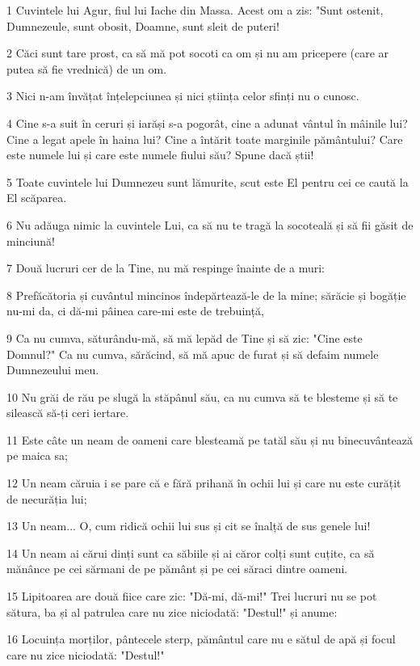 \par 1 Cuvintele lui Agur, fiul lui Iache din Massa. Acest om a zis: "Sunt ostenit, Dumnezeule, sunt obosit, Doamne, sunt sleit de puteri!
\par 2 Căci sunt tare prost, ca să mă pot socoti ca om și nu am pricepere (care ar putea să fie vrednică) de un om.
\par 3 Nici n-am învățat înțelepciunea și nici știința celor sfinți nu o cunosc.
\par 4 Cine s-a suit în ceruri și iarăși s-a pogorât, cine a adunat vântul în mâinile lui? Cine a legat apele în haina lui? Cine a întărit toate marginile pământului? Care este numele lui și care este numele fiului său? Spune dacă știi!
\par 5 Toate cuvintele lui Dumnezeu sunt lămurite, scut este El pentru cei ce caută la El scăparea.
\par 6 Nu adăuga nimic la cuvintele Lui, ca să nu te tragă la socoteală și să fii găsit de minciună!
\par 7 Două lucruri cer de la Tine, nu mă respinge înainte de a muri:
\par 8 Prefăcătoria și cuvântul mincinos îndepărtează-le de la mine; sărăcie și bogăție nu-mi da, ci dă-mi pâinea care-mi este de trebuință,
\par 9 Ca nu cumva, săturându-mă, să mă lepăd de Tine și să zic: "Cine este Domnul?" Ca nu cumva, sărăcind, să mă apuc de furat și să defaim numele Dumnezeului meu.
\par 10 Nu grăi de rău pe slugă la stăpânul său, ca nu cumva să te blesteme și să te silească să-ți ceri iertare.
\par 11 Este câte un neam de oameni care blesteamă pe tatăl său și nu binecuvântează pe maica sa;
\par 12 Un neam căruia i se pare că e fără prihană în ochii lui și care nu este curățit de necurăția lui;
\par 13 Un neam... O, cum ridică ochii lui sus și cit se înalță de sus genele lui!
\par 14 Un neam ai cărui dinți sunt ca săbiile și ai căror colți sunt cuțite, ca să mănânce pe cei sărmani de pe pământ și pe cei săraci dintre oameni.
\par 15 Lipitoarea are două fiice care zic: "Dă-mi, dă-mi!" Trei lucruri nu se pot sătura, ba și al patrulea care nu zice niciodată: "Destul!" și anume:
\par 16 Locuința morților, pântecele sterp, pământul care nu e sătul de apă și focul care nu zice niciodată: "Destul!"
